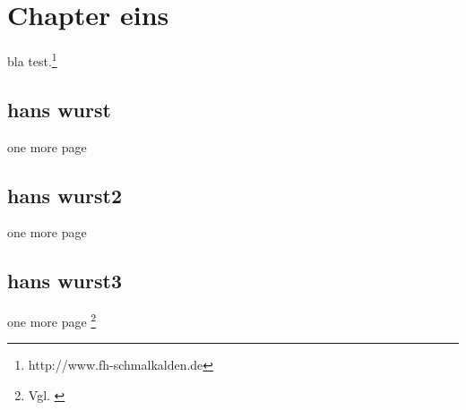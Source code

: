 \chapter{Chapter eins}
bla test.\footnote{http://www.fh-schmalkalden.de}
\newpage

\section{hans wurst}
one more page

\newpage
\section{hans wurst2}
one more page

\newpage
\section{hans wurst3}
one more page \footnote{Vgl. \cite{braun:scala}}

